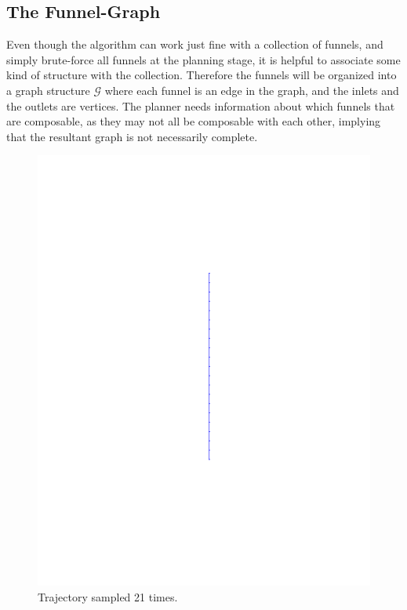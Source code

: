\subsection{The Funnel-Graph}

Even though the \rrtfunnel{} algorithm can work just fine with a collection of
funnels, and simply brute-force all funnels at the planning stage, it is helpful
to associate some kind of structure with the collection. Therefore the funnels
will be organized into a graph structure \(\mathcal{G}\) where each funnel is an
edge in the graph, and the inlets and the outlets are vertices. The planner
needs information about which funnels that are composable, as they may not all
be composable with each other, implying that the resultant graph is not
necessarily complete.

\begin{figure}[!t]
  \begin{minipage}[l]{.45\columnwidth}
    \includegraphics[trim={-5cm 5cm -5cm 5cm},
    width=.9\columnwidth,
    scale=20]
    {figures/method/trajectory-sampled}
    \caption{Trajectory sampled 21 times.}
  \end{minipage} \; %

\end{figure}

